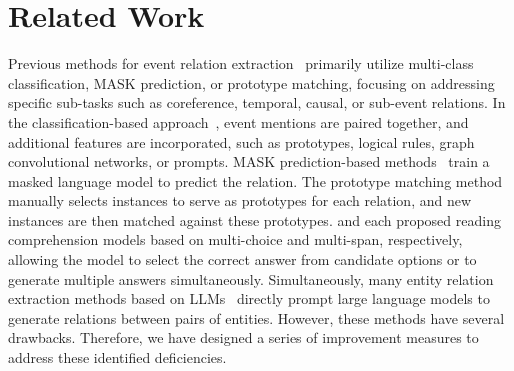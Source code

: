 \section{Related Work}
Previous methods for event relation extraction~\cite{hieu2022selecting,hwang-etal-2022-event,huang2023classification,DBLP:conf/acl/BarhomSEBRD19,DBLP:conf/acl/HuLJ0GGC23,wang-etal-2022-maven,DBLP:conf/eacl/TanPH23} primarily utilize multi-class classification, MASK prediction, or prototype matching, focusing on addressing specific sub-tasks such as coreference, temporal, causal, or sub-event relations. In the classification-based approach~\cite{huang2023classification,DBLP:conf/naacl/LuN21,DBLP:conf/acl/TranPN20,DBLP:conf/coling/ZengJGGC20,DBLP:conf/emnlp/WangCZR20,DBLP:conf/acl/BarhomSEBRD19}, event mentions are paired together, and additional features are incorporated, such as prototypes, logical rules, graph convolutional networks, or prompts. MASK prediction-based methods~\cite{DBLP:journals/corr/abs-2307-09813,DBLP:conf/coling/ShenZWQ22,DBLP:conf/coling/CuiSCLLS22} train a masked language model to predict the relation. The prototype matching method~\cite{hu2023protoem} manually selects instances to serve as prototypes for each relation, and new instances are then matched against these prototypes. \citet{DBLP:conf/emnlp/SegalESGB20} and \citet{hu-etal-2019-multi} each proposed reading comprehension models based on multi-choice and multi-span, respectively, allowing the model to select the correct answer from candidate options or to generate multiple answers simultaneously. Simultaneously, many entity relation extraction methods based on LLMs~\cite{wang2023instructuie,xiao2024yayiuie} directly prompt large language models to generate relations between pairs of entities. However, these methods have several drawbacks. Therefore, we have designed a series of improvement measures to address these identified deficiencies.